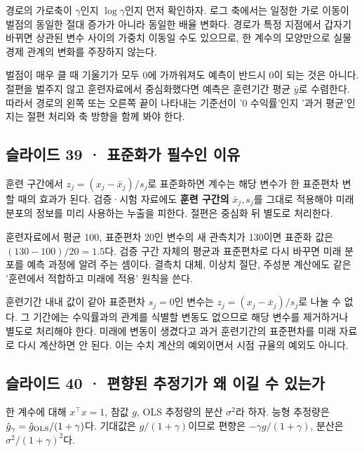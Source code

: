 \documentclass[11pt,a4paper]{article}
\begin{document}
경로의 가로축이 $\gamma$인지 $\log\gamma$인지 먼저 확인하자. 로그 축에서는 일정한 가로 이동이 벌점의 동일한 절대 증가가 아니라 동일한 배율 변화다. 경로가 특정 지점에서 갑자기 바뀌면 상관된 변수 사이의 가중치 이동일 수도 있으므로, 한 계수의 모양만으로 실물경제 관계의 변화를 주장하지 않는다.\par

벌점이 매우 클 때 기울기가 모두 0에 가까워져도 예측이 반드시 0이 되는 것은 아니다. 절편을 벌주지 않고 훈련자료에서 중심화했다면 예측은 훈련기간 평균 $\bar y$로 수렴한다. 따라서 경로의 왼쪽 또는 오른쪽 끝이 나타내는 기준선이 '0 수익률'인지 '과거 평균'인지는 절편 처리와 축 방향을 함께 봐야 한다.\par

\subsection{슬라이드 39 · 표준화가 필수인 이유}
훈련 구간에서 $z_j=(x_j-\bar x_j)/s_j$로 표준화하면 계수는 해당 변수가 한 표준편차 변할 때의 효과가 된다. 검증·시험 자료에도 \textbf{훈련 구간의} $\bar x_j,s_j$를 그대로 적용해야 미래 분포의 정보를 미리 사용하는 누출을 피한다. 절편은 중심화 뒤 별도로 처리한다.\par

훈련자료에서 평균 100, 표준편차 20인 변수의 새 관측치가 130이면 표준화 값은 $(130-100)/20=1.5$다. 검증 구간 자체의 평균과 표준편차로 다시 바꾸면 미래 분포를 예측 과정에 알려 주는 셈이다. 결측치 대체, 이상치 절단, 주성분 계산에도 같은 '훈련에서 적합하고 미래에 적용' 원칙을 쓴다.\par

훈련기간 내내 값이 같아 표준편차 $s_j=0$인 변수는 $z_j=(x_j-\bar x_j)/s_j$로 나눌 수 없다. 그 기간에는 수익률과의 관계를 식별할 변동도 없으므로 해당 변수를 제거하거나 별도로 처리해야 한다. 미래에 변동이 생겼다고 과거 훈련기간의 표준편차를 미래 자료로 다시 계산하면 안 된다. 이는 수치 계산의 예외이면서 시점 규율의 예외도 아니다.\par

\subsection{슬라이드 40 · 편향된 추정기가 왜 이길 수 있는가}
한 계수에 대해 $x^\top x=1$, 참값 $g$, OLS 추정량의 분산 $\sigma^2$라 하자. 능형 추정량은 $\hat g_\gamma=\hat g_{\rm OLS}/(1+\gamma)$다. 기대값은 $g/(1+\gamma)$이므로 편향은 $-\gamma g/(1+\gamma)$, 분산은 $\sigma^2/(1+\gamma)^2$다.\par
\end{document}
